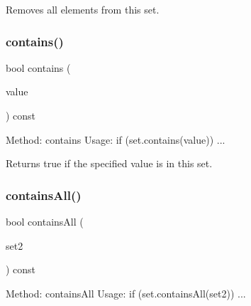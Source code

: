 Removes all elements from this set. 

\mbox{\label{classstanfordcpplib_1_1collections_1_1GenericSet_a9b67116c496b2347931664ac27c37921}} 
\subsubsection{\texorpdfstring{contains()}{contains()}}
{\footnotesize\ttfamily bool contains (\begin{DoxyParamCaption}\item[{const \mbox{\hyperlink{classstanfordcpplib_1_1collections_1_1GenericSet_a669c81f158766925e7293f97c0099b28}{value\+\_\+type}} \&}]{value }\end{DoxyParamCaption}) const}



Method\+: contains Usage\+: if (set.\+contains(value)) ... 



 Returns {\ttfamily true} if the specified value is in this set. \mbox{\label{classstanfordcpplib_1_1collections_1_1GenericSet_abaa27e9ac99d4d889625d3989b40f0b6}} 
\subsubsection{\texorpdfstring{contains\+All()}{containsAll()}}
{\footnotesize\ttfamily bool contains\+All (\begin{DoxyParamCaption}\item[{const \mbox{\hyperlink{classstanfordcpplib_1_1collections_1_1GenericSet}{Generic\+Set}}$<$ \mbox{\hyperlink{structstanfordcpplib_1_1collections_1_1SetTraits}{Set\+Traits}} $>$ \&}]{set2 }\end{DoxyParamCaption}) const}



Method\+: contains\+All Usage\+: if (set.\+contains\+All(set2)) ... 



